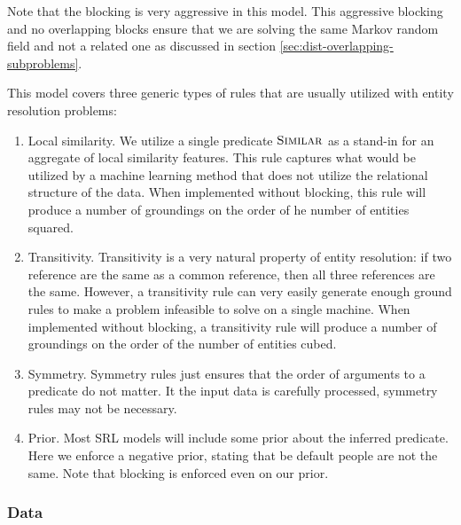 \documentclass{article}
\begin{document}
            Note that the blocking is very aggressive in this model.
            This aggressive blocking and no overlapping blocks ensure that we are solving the same Markov random field and not a related one as discussed in section \ref{sec:dist-overlapping-subproblems}.
            
            This model covers three generic types of rules that are usually utilized with entity resolution problems:
            \begin{enumerate}
                \item Local similarity.
                We utilize a single predicate $ \textsc{Similar} $ as a stand-in for an aggregate of local similarity features.
                This rule captures what would be utilized by a machine learning method that does not utilize the relational structure of the data.
                When implemented without blocking, this rule will produce a number of groundings on the order of he number of entities squared.
                
                \item Transitivity.
                Transitivity is a very natural property of entity resolution: if two reference are the same as a common reference, then all three references are the same.
                However, a transitivity rule can very easily generate enough ground rules to make a problem infeasible to solve on a single machine.
                When implemented without blocking, a transitivity rule will produce a number of groundings on the order of the number of entities cubed.
                
                \item Symmetry.
                Symmetry rules just ensures that the order of arguments to a predicate do not matter.
                It the input data is carefully processed, symmetry rules may not be necessary.
                
                \item Prior.
                Most SRL models will include some prior about the inferred predicate.
                Here we enforce a negative prior, stating that be default people are not the same.
                Note that blocking is enforced even on our prior.
            \end{enumerate}
    
        \subsubsection{Data}
    
\end{document}
